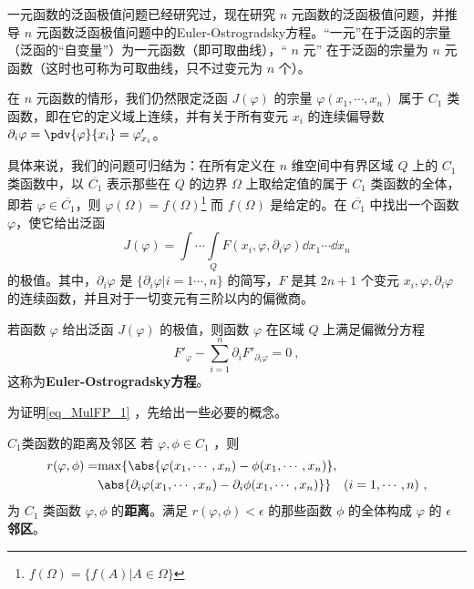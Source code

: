 一元函数的泛函极值问题已经研究过，现在研究 $n$ 元函数的泛函极值问题，并推导 $n$ 元函数泛函极值问题中的Euler-Ostrogradsky方程。“一元”在于泛函的宗量（泛函的“自变量”）为一元函数（即可取曲线），“ $n$ 元” 在于泛函的宗量为 $n$ 元函数（这时也可称为可取曲线，只不过变元为 $n$ 个）。

在 $n$ 元函数的情形，我们仍然限定泛函 $J(\varphi)$ 的宗量 $\varphi(x_1,\cdots,x_n)$ 属于 $C_1$ 类函数，即在它的定义域上连续，并有关于所有变元 $x_i$ 的连续偏导数 $\partial_i\varphi=\pdv{\varphi}{x_i}=\varphi'_{x_i}$。

具体来说，我们的问题可归结为：在所有定义在 $n$ 维空间中有界区域 $Q$ 上的 $C_1$ 类函数中，以 $\overline{C_1}$ 表示那些在 $Q$ 的边界 $\Omega$ 上取给定值的属于 $C_1$ 类函数的全体，即若 $\varphi\in\overline{C_1}$，则 $\varphi(\Omega)=f(\Omega)$\footnote{$f(\Omega)=\{f(A)|A\in \Omega\}$} 而 $f(\Omega)$ 是给定的。在 $\overline{C_1}$ 中找出一个函数 $\varphi$，使它给出泛函
\begin{equation}
J(\varphi)=\int\cdots\int\limits_Q F(x_i,\varphi,\partial_i\varphi)\dd x_1\cdots\dd x_n
\end{equation}
的极值。其中，$\partial_i\varphi$ 是 $\{\partial_i\varphi|i=1\cdots,n\}$ 的简写，$F$ 是其 $2n+1$ 个变元 $x_i,\varphi,\partial_i\varphi$ 的连续函数，并且对于一切变元有三阶以内的偏微商。

若函数 $\varphi$ 给出泛函 $J(\varphi)$ 的极值，则函数 $\varphi$ 在区域 $Q$ 上满足偏微分方程
\begin{equation}\label{eq_MulFP_1}
F'_\varphi-\sum_{i=1}^n\partial_i F'_{\partial_i\varphi}=0~,
\end{equation}
这称为\textbf{Euler-Ostrogradsky方程}。

为证明\autoref{eq_MulFP_1} ，先给出一些必要的概念。
\begin{definition}{$C_1$类函数的距离及邻区}
若 $\varphi,\phi\in C_1$ ，则
\begin{equation}
\begin{aligned}
r(\varphi,\phi)=&\mathrm{max}\{\abs{\varphi(x_1,\cdots,x_n)-\phi(x_1,\cdots,x_n)},\\
&\abs{\partial_i\varphi(x_1,\cdots,x_n)-\partial_i\phi(x_1,\cdots,x_n)}\}\quad (i=1,\cdots,n)~,
\end{aligned}
\end{equation}
为 $C_1$ 类函数 $\varphi,\phi$ 的\textbf{距离}。满足 $r(\varphi,\phi)<\epsilon$ 的那些函数 $\phi$ 的全体构成 $\varphi$ 的 $\epsilon$ \textbf{邻区}。 
\end{definition}
